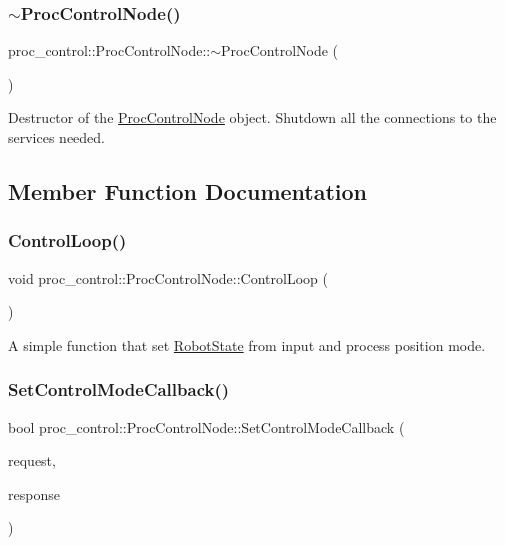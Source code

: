 \subsubsection{\texorpdfstring{$\sim$\+Proc\+Control\+Node()}{~ProcControlNode()}}
{\footnotesize\ttfamily proc\+\_\+control\+::\+Proc\+Control\+Node\+::$\sim$\+Proc\+Control\+Node (\begin{DoxyParamCaption}{ }\end{DoxyParamCaption})}

Destructor of the \hyperlink{classproc__control_1_1_proc_control_node}{Proc\+Control\+Node} object. Shutdown all the connections to the services needed. 

\subsection{Member Function Documentation}
\mbox{\label{classproc__control_1_1_proc_control_node_adc8a2178d41c620f69cb74c2f09097cd}} 
\subsubsection{\texorpdfstring{Control\+Loop()}{ControlLoop()}}
{\footnotesize\ttfamily void proc\+\_\+control\+::\+Proc\+Control\+Node\+::\+Control\+Loop (\begin{DoxyParamCaption}{ }\end{DoxyParamCaption})}

A simple function that set \hyperlink{classproc__control_1_1_robot_state}{Robot\+State} from input and process position mode. \mbox{\label{classproc__control_1_1_proc_control_node_ac56aa1e6e028c225be157371aba76d32}} 
\subsubsection{\texorpdfstring{Set\+Control\+Mode\+Callback()}{SetControlModeCallback()}}
{\footnotesize\ttfamily bool proc\+\_\+control\+::\+Proc\+Control\+Node\+::\+Set\+Control\+Mode\+Callback (\begin{DoxyParamCaption}\item[{proc\+\_\+control\+::\+Set\+Control\+Mode\+Request \&}]{request,  }\item[{proc\+\_\+control\+::\+Set\+Control\+Mode\+Response \&}]{response }\end{DoxyParamCaption})}


